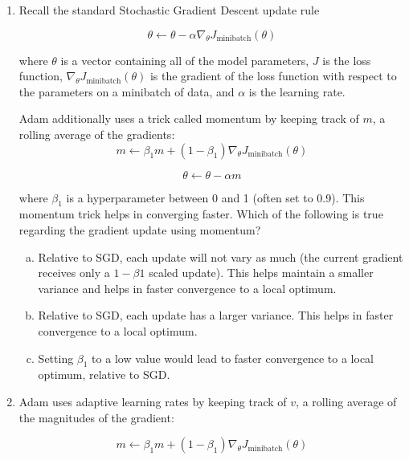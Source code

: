 \begin{enumerate}[1.]
\item {}
Recall the standard Stochastic Gradient Descent update rule

\begin{equation*}
        \theta \gets \theta - \alpha \nabla_{\theta} J_{\text{minibatch}}(\theta)
\end{equation*}

where $\theta$ is a vector containing all of the model parameters, $J$ is the loss function, $\nabla_{\theta} J_{\text{minibatch}}(\theta)$ is the gradient of the loss function with respect to the parameters on a minibatch of data, and $\alpha$ is the learning rate.

Adam additionally uses a trick called momentum by keeping track of $m$, a rolling average of the gradients:
\begin{equation*}
    m \gets \beta_1m + (1 - \beta_1)\nabla_{\theta} J_{\text{minibatch}}(\theta)
\end{equation*}
        
\begin{equation*}
    \theta \gets \theta - \alpha m
\end{equation*}

where $\beta_1$ is a hyperparameter between 0 and 1 (often set to 0.9). This momentum trick helps in converging faster. Which of the following is true regarding the gradient update using momentum?

\begin{enumerate}[(a)]
\item Relative to SGD, each update will not vary as much (the current gradient receives only a $1 - \beta1$ scaled update). This helps maintain a smaller variance and helps in faster convergence to a local optimum.
\item Relative to SGD, each update has a larger variance. This helps in faster convergence to a local optimum.
\item Setting $\beta_1$ to a low value would lead to faster convergence to a local optimum, relative to SGD.
\end{enumerate}


\item {}
Adam uses adaptive learning rates by keeping track of $v$, a rolling average of the magnitudes of the gradient:
        
\begin{equation*}
    m \gets \beta_1m + (1 - \beta_1)\nabla_{\theta} J_{\text{minibatch}}(\theta)
\end{equation*}


\end{enumerate}
